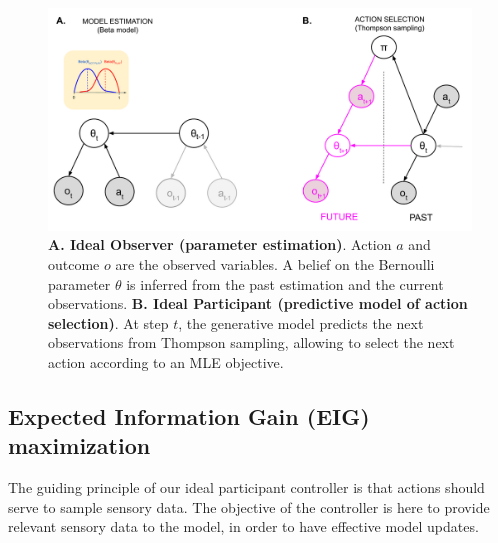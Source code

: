 \documentclass[10pt,letterpaper]{article}
\begin{document}
\begin{figure}[h]
\centering
\includegraphics[width=\textwidth]{figs/graphical model.pdf}
\caption{{\bf A. Ideal Observer (parameter estimation)}. Action $a$ and outcome $o$ are the observed variables. A belief on the Bernoulli parameter $\theta$ is inferred from the past estimation and the current observations. {\bf B. Ideal Participant (predictive model of action selection)}. At step $t$, the generative model predicts the next observations from Thompson sampling, allowing to select the next action according to an MLE objective.}
\label{fig:1}
\end{figure}
\subsection{Expected Information Gain (EIG) maximization}



The guiding principle of our ideal participant controller is that actions should serve to sample sensory data.
The objective of the controller is here to provide relevant sensory data to the model, in order to have effective model updates. 
\end{document}
